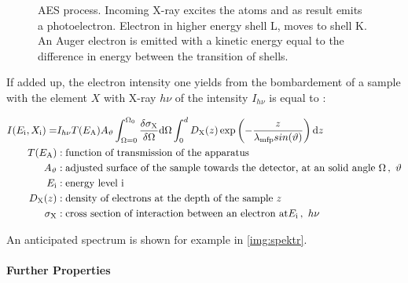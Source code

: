 \documentclass[numbers=noenddot,a4paper,notitlepage,twoside,BCOR15mm]{article}
\newcommand{\diff}{\textnormal{d}}
\newcommand{\ix}[1]{_\text{#1}}
\begin{document}
			\begin{figure}[h]
				\centering
				\caption{AES process. Incoming X-ray excites the atoms and as result emits a photoelectron. Electron in higher energy shell L, moves to shell K. An Auger electron is emitted with a kinetic energy equal to the difference in energy between the transition of shells. \cite{XPSAuger}}\label{img:auger}
			\end{figure}

	\clearpage

		If added up, the electron intensity one yields from the bombardement of a sample with the element $X$ with X-ray $h\nu$ of the intensity $I_{h\nu}$ is equal to \cite{XPSRapha}:

			\begin{align}
				I(E\ix{i},X\ix{i})=&I_{h\nu}T(E\ix{A})A_{\vartheta}\int_{\Omega=0}^{\Omega\ix{0}}\frac{\delta\sigma\ix{X}}{\delta\Omega}\diff \Omega\int_{0}^{d}D\ix{X}(z)\exp\left(-\frac{z}{\lambda\ix{mfp}sin(\vartheta)}\right)\diff z \label{eq:intens} \\
				T(E\ix{A})&: \text{function of transmission of the apparatus} \nonumber\\
				A_{\vartheta}&: \text{adjusted surface of the sample towards the detector, at an solid angle } \Omega\, ,\,\,\vartheta \nonumber\\
				E\ix{i}&: \text{energy level i} \nonumber\\
				D\ix{X}(z)&: \text{density of electrons at the depth of the sample } z \nonumber\\
				\sigma\ix{X}&: \text{cross section of interaction between an electron at} E\ix{i}\, ,\,\, h\nu \nonumber
			\end{align}

		An anticipated spectrum is shown for example in \autoref{img:spektr}.

		\paragraph{Further Properties}
\end{document}
